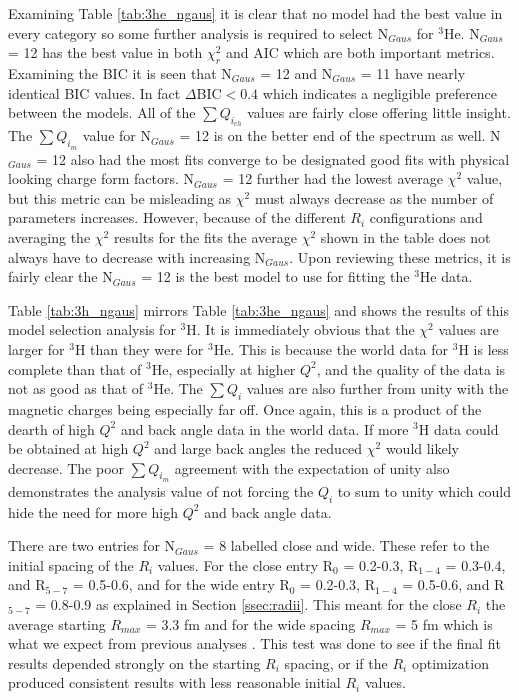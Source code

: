 Examining Table \ref{tab:3he_ngaus} it is clear that no model had the best value in every category so some further analysis is required to select N$_{Gaus}$ for $^3$He. N$_{Gaus}$ = 12 has the best value in both $\chi^2_r$ and AIC which are both important metrics. Examining the BIC it is seen that N$_{Gaus}$ = 12 and N$_{Gaus}$ = 11 have nearly identical BIC values. In fact $\Delta$BIC$<0.4$ which indicates a negligible preference between the models. All of the $\sum Q_{i_{ch}}$ values are fairly close offering little insight. The $\sum Q_{i_{m}}$ value for N$_{Gaus}$ = 12 is on the better end of the spectrum as well. N$_{Gaus}$ = 12 also had the most fits converge to be designated good fits with physical looking charge form factors. N$_{Gaus}$ = 12 further had the lowest average $\chi^2$ value, but this metric can be misleading as $\chi^2$ must always decrease as the number of parameters increases. However, because of the different $R_i$ configurations and averaging the $\chi^2$ results for the fits the average $\chi^2$ shown in the table does not always have to decrease with increasing N$_{Gaus}$. Upon reviewing these metrics, it is fairly clear the N$_{Gaus}$ = 12 is the best model to use for fitting the $^3$He data.

Table \ref{tab:3h_ngaus} mirrors Table \ref{tab:3he_ngaus} and shows the results of this model selection analysis for $^3$H. It is immediately obvious that the $\chi^2$ values are larger for $^3$H than they were for $^3$He. This is because the world data for $^3$H is less complete than that of $^3$He, especially at higher $Q^2$, and the quality of the data is not as good as that of $^3$He. The $\sum Q_i$ values are also further from unity with the magnetic charges being especially far off. Once again, this is a product of the dearth of high $Q^2$ and back angle data in the world data. If more $^3$H data could be obtained at high $Q^2$ and large back angles the reduced $\chi^2$ would likely decrease. The poor $\sum Q_{i_{m}}$ agreement with the expectation of unity also demonstrates the analysis value of not forcing the $Q_i$ to sum to unity which could hide the need for more high $Q^2$ and back angle data.

There are two entries for N$_{Gaus}$ = 8 labelled close and wide. These refer to the initial spacing of the $R_i$ values. For the close entry R$_0$ = 0.2-0.3, R$_{1-4}$ = 0.3-0.4, and R$_{5-7}$ = 0.5-0.6, and for the wide entry R$_0$ = 0.2-0.3, R$_{1-4}$ = 0.5-0.6, and R$_{5-7}$ = 0.8-0.9 as explained in Section \ref{ssec:radii}. This meant for the close $R_i$ the average starting $R_{max}$ = 3.3 fm and for the wide spacing $R_{max}$ = 5 fm which is what we expect from previous analyses \cite{Article:Amroun}. This test was done to see if the final fit results depended strongly on the starting $R_i$ spacing, or if the $R_i$ optimization produced consistent results with less reasonable initial $R_i$ values.

